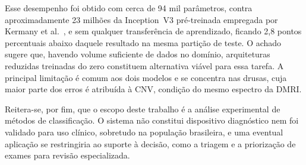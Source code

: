 \documentclass[conference]{IEEEtran}
\begin{document}
Esse desempenho foi obtido com cerca de 94 mil parâmetros, contra aproximadamente 23 milhões da Inception~V3 pré-treinada empregada por Kermany et al.~\cite{kermany2018}, e sem qualquer transferência de aprendizado, ficando 2,8 pontos percentuais abaixo daquele resultado na mesma partição de teste. O achado sugere que, havendo volume suficiente de dados no domínio, arquiteturas reduzidas treinadas do zero constituem alternativa viável para essa tarefa. A principal limitação é comum aos dois modelos e se concentra nas drusas, cuja maior parte dos erros é atribuída à CNV, condição do mesmo espectro da DMRI.

Reitera-se, por fim, que o escopo deste trabalho é a análise experimental de métodos de classificação. O sistema não constitui dispositivo diagnóstico nem foi validado para uso clínico, sobretudo na população brasileira, e uma eventual aplicação se restringiria ao suporte à decisão, como a triagem e a priorização de exames para revisão especializada.




\end{document}

